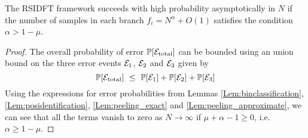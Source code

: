 \begin{theorem} \label{thm:OverallErrorProb}
	The RSIDFT framework succeeds with high probability asymptotically in $N$ if the number of samples in each branch $f_i = N^{\alpha}+O(1)$ satisfies the condition $\alpha > 1-\mu$.
\end{theorem}
\begin{proof}
The overall probability of error $\mathbb{P}[\mathcal{E}_{\text{total}}]$ can be bounded using an union bound on the three error events $\mathcal{E}_1$, $\mathcal{E}_2$ and $\mathcal{E}_3$ given by  	$$
\mathbb{P}[\mathcal{E}_{\text{total}}] ~\leq~  \mathbb{P}[\mathcal{E}_1] +  \mathbb{P}[\mathcal{E}_2] + \mathbb{P}[\mathcal{E}_3]
$$
Using the expressions for error probabilities from Lemmas \ref{Lem:binclassification}, \ref{Lem:posidentification}, \ref{Lem:peeling_exact} and \ref{Lem:peeling_approximate}, we can see that all the terms vanish to zero as $N \rightarrow \infty$ if $\mu+\alpha-1 \geq 0$, i.e. $\alpha \geq 1-\mu$.
\end{proof}
